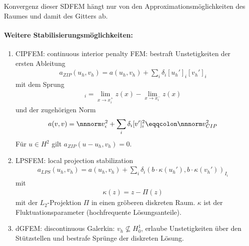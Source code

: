 Konvergenz dieser SDFEM hängt nur von den Approximationsmöglichkeiten des Raumes und damit des Gitters ab. 
\paragraph{Weitere Stabilisierungsmöglichkeiten:}
\label{sec:weit-stabili}
\begin{enumerate}
\item CIPFEM: continuous interior penalty FEM: bestraft Unstetigkeiten der ersten Ableitung
  \begin{align*}
    a_{ZIP}(u_{h}, v_{h}) =  a(u_{h}, v_{h}) + \sum_{i}\delta_{i}[u_{h}']_{i}[v_{h}']_{i}
  \end{align*}
  mit dem Sprung
  \begin{align*}
    [z]_{i} = \lim_{x \to x_{i}^{+}} z(x) - \lim_{x \to x_{i}^{-}} z(x)
  \end{align*}
  und der zugehörigen Norm
  \begin{align*}
    a(v, v) = \nnnorm v_{\epsilon}^{2} + \sum_{i} \delta_{i} [v']_{i}^{2} \eqqcolon \nnnorm v_{CIP}^{2}
  \end{align*}
  Für $u \in H^{2}$ gilt $a_{ZIP}(u-u_{h}, v_{h}) = 0$. 
\item LPSFEM: local projection stabilization
  \begin{align*}
    a_{LPS}(u_{h}, v_{h}) = a(u_{h}, v_{h}) + \sum_{i} \delta_{i}(b\cdot \kappa(u_{h}'), b\cdot \kappa(v_{h}'))_{I_{i}}
  \end{align*}
  mit
  \begin{align*}
    \kappa(z) = z - \Pi(z)
  \end{align*}
  mit der $L_{2}$-Projektion $\Pi$ in einen gröberen diskreten Raum. $\kappa$ ist der Fluktuationsparameter (hochfrequente Lösungsanteile). 
\item dGFEM: discontinuous Galerkin: $v_{h} \not \subseteq H_{0}^{1}$, erlaube Unstetigkeiten über den Stützstellen und bestrafe Sprünge der diskreten Lösung.
\end{enumerate}

